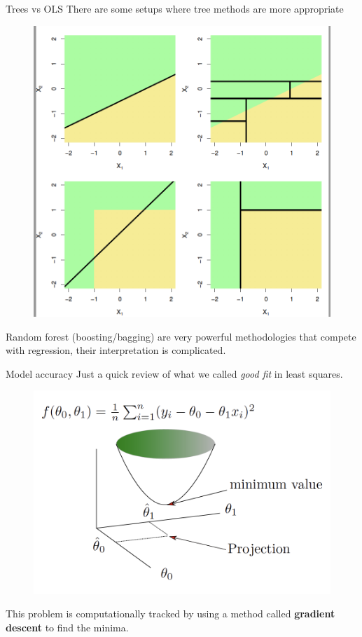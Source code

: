 \documentclass{beamer}
\begin{document}
\begin{frame}{Trees vs OLS}
	There are some setups where tree methods are more appropriate
	\begin{figure}[h]
	\centering
	\includegraphics[scale=0.30]{Figures/fig_trees_vs_ols.png}
\end{figure}			
	
Random forest (boosting/bagging) are very powerful methodologies that compete with regression, their interpretation is complicated.
\end{frame}

\begin{frame}{Model accuracy}
Just a quick review of what we called \textit{good fit} in least squares.
	\begin{figure}[h]
	\centering
	\includegraphics[scale=0.35]{Figures/fig_minfunc.png}
\end{figure}			
This problem is computationally tracked by using a method called \textbf{gradient descent} to find the minima.
\end{frame}
\end{document}
